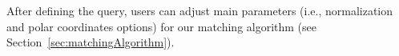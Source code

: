 After defining the query, users can adjust main parameters (i.e., normalization and polar coordinates options) for our matching algorithm (see Section~\ref{sec:matchingAlgorithm}). 
%

